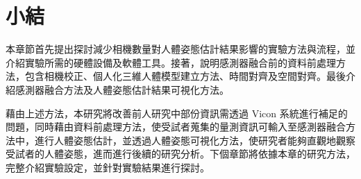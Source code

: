 \section{小結}
本章節首先提出探討減少相機數量對人體姿態估計結果影響的實驗方法與流程，並介紹實驗所需的硬體設備及軟體工具。接著，說明感測器融合前的資料前處理方法，包含相機校正、個人化三維人體模型建立方法、時間對齊及空間對齊。最後介紹感測器融合方法及人體姿態估計結果可視化方法。

藉由上述方法，本研究將改善前人研究中部份資訊需透過 Vicon 系統進行補足的問題，同時藉由資料前處理方法，使受試者蒐集的量測資訊可輸入至感測器融合方法中，進行人體姿態估計，並透過人體姿態可視化方法，使研究者能夠直觀地觀察受試者的人體姿態，進而進行後續的研究分析。下個章節將依據本章的研究方法，完整介紹實驗設定，並針對實驗結果進行探討。
\clearpage
